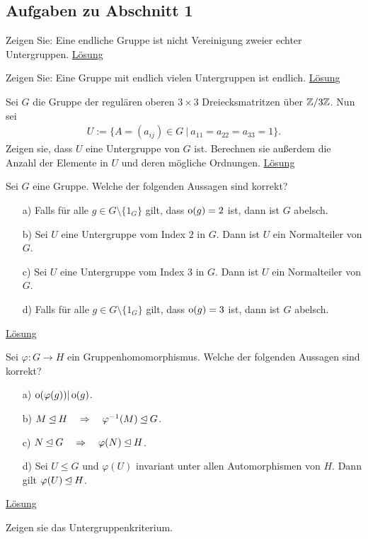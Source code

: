 \subsection{Aufgaben zu Abschnitt 1}

\begin{exe}\label{aufgabe:1.1} 
Zeigen Sie: Eine endliche Gruppe ist nicht Vereinigung zweier echter Untergruppen.
\hyperlink{loes:1.1}{Lösung}
\end{exe}

\begin{exe}\label{aufgabe:1.2} 
Zeigen Sie: Eine Gruppe mit endlich vielen Untergruppen ist endlich.
\hyperlink{loes:1.2}{Lösung}
\end{exe}

\begin{exe}\label{aufgabe:1.3} 
Sei $G$ die Gruppe der regulären oberen $3 \times 3$ Dreiecksmatritzen über $\mathbb{Z} / 3 \mathbb{Z}$.
Nun sei 
\begin{align*}
U :=  \lbrace A = (a_{ij}) \in G \ | \ a_{11} = a_{22} = a_{33} = 1 \rbrace.
\end{align*}
Zeigen sie, dass $U $ eine Untergruppe von $G$ ist.
Berechnen sie außerdem die Anzahl der Elemente in $U$ und deren mögliche Ordnungen.
\hyperlink{loes:1.3}{Lösung}
\end{exe}

\begin{exe}\label{aufgabe:1.4} 
Sei $G$ eine Gruppe. Welche der folgenden Aussagen sind korrekt?
\begin{enumerate}
\item[a)]
Falls für alle $g \in G \setminus \lbrace 1_G \rbrace$ gilt, dass $\operatorname{o}(g) = 2$ ist, dann ist $G$ abelsch.
\item[b)]
Sei $U$ eine Untergruppe vom Index $2$ in $G$. Dann ist $U$ ein Normalteiler von $G$.
\item[c)]
Sei $U$ eine Untergruppe vom Index $3$ in $G$. Dann ist $U$ ein Normalteiler von $G$.
\item[d)]
Falls für alle $g \in G \setminus \lbrace 1_G \rbrace$ gilt, dass $\operatorname{o}(g) = 3$ ist, dann ist $G$ abelsch.
\end{enumerate}
\hyperlink{loes:1.4}{Lösung}
\end{exe}

\begin{exe}\label{aufgabe:1.5} 
Sei $\varphi : G \to H$ ein Gruppenhomomorphismus.
Welche der folgenden Aussagen sind korrekt?

\begin{enumerate}
\item[a)]
$\operatorname{o}(\varphi(g)) | \operatorname{o}(g)$.
\item[b)]
$M \unlhd H \quad \Rightarrow \quad \varphi^{-1}(M) \unlhd G$.
\item[c)]
$N \unlhd G \quad \Rightarrow \quad \varphi(N) \unlhd H$.
\item[d)]
Sei $U \leq G$ und $\varphi(U)$ invariant unter allen Automorphismen von $H$.
Dann gilt $\varphi(U) \unlhd H$.
\end{enumerate}
\hyperlink{loes:1.5}{Lösung}
\end{exe}

\begin{exe}\label{aufgabe:1.6} 
Zeigen sie das Untergruppenkriterium.
\end{exe}